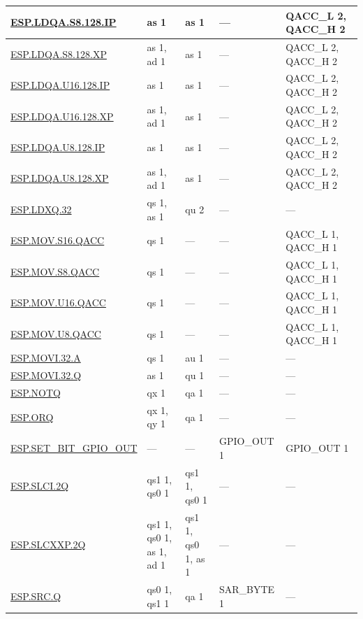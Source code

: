 \begin{longtable}[c]{|l|m{2.5cm}|m{2.5cm}|m{2.5cm}|m{2.5cm}|}
    \hyperref[instruction:ESPLDQAS8128IP]{ESP.LDQA.S8.128.IP} & as 1 & as 1 & — & QACC\_L 2, QACC\_H 2\\\hline
    \hyperref[instruction:ESPLDQAS8128XP]{ESP.LDQA.S8.128.XP} & as 1, ad 1 & as 1 & — & QACC\_L 2, QACC\_H 2\\\hline
    \hyperref[instruction:ESPLDQAU16128IP]{ESP.LDQA.U16.128.IP} & as 1 & as 1 & — & QACC\_L 2, QACC\_H 2\\\hline
    \hyperref[instruction:ESPLDQAU16128XP]{ESP.LDQA.U16.128.XP} & as 1, ad 1 & as 1 & — & QACC\_L 2, QACC\_H 2\\\hline
    \hyperref[instruction:ESPLDQAU8128IP]{ESP.LDQA.U8.128.IP} & as 1 & as 1 & — & QACC\_L 2, QACC\_H 2\\\hline
    \hyperref[instruction:ESPLDQAU8128XP]{ESP.LDQA.U8.128.XP} & as 1, ad 1 & as 1 & — & QACC\_L 2, QACC\_H 2\\\hline
    \hyperref[instruction:ESPLDXQ32]{ESP.LDXQ.32} & qs 1, as 1 & qu 2 & — & — \\\hline
    \hyperref[instruction:ESPMOVS16QACC]{ESP.MOV.S16.QACC} & qs 1 & — & — & QACC\_L 1, QACC\_H 1\\\hline
    \hyperref[instruction:ESPMOVS8QACC]{ESP.MOV.S8.QACC} & qs 1 & — & — & QACC\_L 1, QACC\_H 1\\\hline
    \hyperref[instruction:ESPMOVU16QACC]{ESP.MOV.U16.QACC} & qs 1 & — & — & QACC\_L 1, QACC\_H 1\\\hline
    \hyperref[instruction:ESPMOVU8QACC]{ESP.MOV.U8.QACC} & qs 1 & — & — & QACC\_L 1, QACC\_H 1\\\hline
    \hyperref[instruction:ESPMOVI32A]{ESP.MOVI.32.A} & qs 1 & au 1 & — & — \\\hline
    \hyperref[instruction:ESPMOVI32Q]{ESP.MOVI.32.Q} & as 1 & qu 1 & — & — \\\hline
    \hyperref[instruction:ESPNOTQ]{ESP.NOTQ} & qx 1 & qa 1 & — & — \\\hline
    \hyperref[instruction:ESPORQ]{ESP.ORQ} & qx 1, qy 1 & qa 1 & — & — \\\hline
    \hyperref[instruction:ESPSETBITGPIOOUT]{ESP.SET\_BIT\_GPIO\_OUT} & — & — & GPIO\_OUT 1 & GPIO\_OUT 1 \\\hline
    \hyperref[instruction:ESPSLCI2Q]{ESP.SLCI.2Q} & qs1 1, qs0 1 & qs1 1, qs0 1 & — & — \\\hline
    \hyperref[instruction:ESPSLCXXP2Q]{ESP.SLCXXP.2Q} & qs1 1, qs0 1, as 1, ad 1 & qs1 1, qs0 1, as 1 & — & — \\\hline
    \hyperref[instruction:ESPSRCQ]{ESP.SRC.Q} & qs0 1, qs1 1 & qa 1 & SAR\_BYTE 1 & — \\\hline

\end{longtable}
